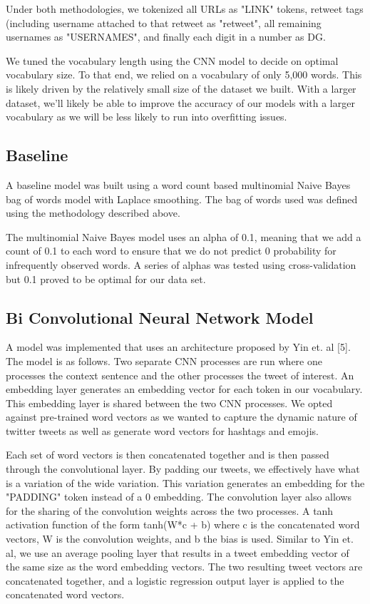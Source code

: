 \documentclass[11pt,a4paper]{article}
\begin{document}
Under both methodologies, we tokenized all URLs as "LINK" tokens, retweet tags (including username attached to that retweet as "retweet", all remaining usernames as "USERNAMES", and finally each digit in a number as DG. 

We tuned the vocabulary length using the CNN model to decide on optimal vocabulary size. To that end, we relied on a vocabulary of only 5,000 words. This is likely driven by the relatively small size of the dataset we built. With a larger dataset, we'll likely be able to improve the accuracy of our models with a larger vocabulary as we will be less likely to run into overfitting issues.

\subsection{Baseline}
A baseline model was built using a word count based multinomial Naive Bayes bag of words model with Laplace smoothing. The bag of words used was defined using the methodology described above. 

The multinomial Naive Bayes model uses an alpha of 0.1, meaning that we add a count of 0.1 to each word to ensure that we do not predict 0 probability for infrequently observed words. A series of alphas was tested using cross-validation but 0.1 proved to be optimal for our data set.

\subsection{Bi Convolutional Neural Network Model}

A model was implemented that uses an architecture proposed by Yin et. al [5]. The model is as follows. Two separate CNN processes are run where one processes the context sentence and the other processes the tweet of interest. An embedding layer generates an embedding vector for each token in our vocabulary. This embedding layer is shared between the two CNN processes. We opted against pre-trained word vectors as we wanted to capture the dynamic nature of twitter tweets as well as generate word vectors for hashtags and emojis. 

Each set of word vectors is then concatenated together and is then passed through the convolutional layer. By padding our tweets, we effectively have what is a variation of the wide variation. This variation generates an embedding for the "PADDING" token instead of a 0 embedding. The convolution layer also allows for the sharing of the convolution weights across the two processes. A tanh activation function of the form tanh(W*c + b)  where c is the concatenated word vectors, W is the convolution weights, and b the bias is used. Similar to Yin et. al, we use an average pooling layer that results in a tweet embedding vector of the same size as the word embedding vectors. The two resulting tweet vectors are concatenated together, and a logistic regression output layer is applied to the concatenated word vectors.
\end{document}
